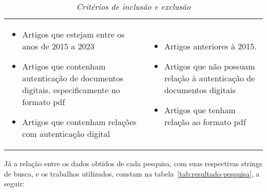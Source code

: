\begin{table}[h!]
    \centering
    \begin{tabularx}{\textwidth}{
        |>{\centering\arraybackslash}X
        |>{\centering\arraybackslash}X
        |}
        \hline
        \multicolumn{1}{|c|}{Critérios de inclusão} & \multicolumn{1}{c|}{
            Critérios de Exclusão} \\ \hline
        \begin{itemize}[leftmargin=10px]
            \item Artigos que estejam entre os anos de 2015 a 2023
            \item Artigos que contenham autenticação de documentos digitais,
            especificamente no formato \acrshort{pdf}
            \item Artigos que contenham relações com autenticação digital
        \end{itemize} &
        \begin{itemize}[leftmargin=10px]
            \item Artigos anteriores à 2015.
            \item Artigos que não possuam relação à autenticação de
            documentos digitais
            \item Artigos que tenham relação ao formato \acrshort{pdf}
        \end{itemize} \\ \hline
    \end{tabularx}
    \caption[Critérios de inclusão e exclusão]{\textit{Critérios de
    inclusão e exclusão}}
    \label{tab:criterios-exclusao}
\end{table}

Já a relação entre os dados obtidos de cada pesquisa, com suas
respectivas strings de busca, e os trabalhos utilizados, constam na
tabela~\ref{tab:resultado-pesquisa}, a seguir:

